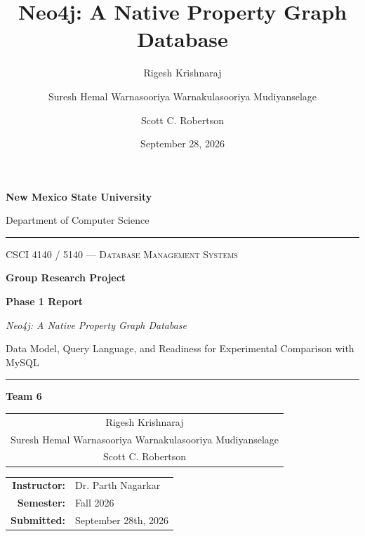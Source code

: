 \documentclass[10pt,a4paper,twocolumn]{article}
\title{\textbf{Neo4j: A Native Property Graph Database}}
\author{Rigesh Krishnaraj \and Suresh Hemal Warnasooriya Warnakulasooriya Mudiyanselage \and Scott C. Robertson}
\date{September 28, 2026}
\begin{document}
\begin{titlepage}
\centering

\vspace*{0.5cm}

{\LARGE\bfseries New Mexico State University \par}
\vspace{0.4cm}
{\large Department of Computer Science \par}

\vspace{1.2cm}

\rule{\textwidth}{0.4pt}
\vspace{0.6cm}

{\large\scshape CSCI 4140 / 5140 --- Database Management Systems \par}

\vspace{0.9cm}

{\Huge\bfseries Group Research Project \par}
\vspace{0.4cm}
{\LARGE\bfseries Phase 1 Report \par}

\vspace{0.7cm}

{\Large\itshape Neo4j: A Native Property Graph Database \par}
\vspace{0.3cm}
{\large Data Model, Query Language, and Readiness for Experimental Comparison with MySQL \par}

\vspace{0.6cm}
\rule{\textwidth}{0.4pt}

\vspace{1.4cm}

{\large\bfseries Team 6 \par}

\vspace{0.8cm}

{\large
\begin{tabular}{c}
Rigesh Krishnaraj \\[0.35cm]
Suresh Hemal Warnasooriya Warnakulasooriya Mudiyanselage \\[0.35cm]
Scott C. Robertson \\
\end{tabular}
\par}

\vfill

{\large
\begin{tabular}{rl}
\textbf{Instructor:} & Dr. Parth Nagarkar \\[0.25cm]
\textbf{Semester:}   & Fall 2026 \\[0.25cm]
\textbf{Submitted:}  & September 28th, 2026 \\
\end{tabular}
\par}


\end{titlepage}
\end{document}
